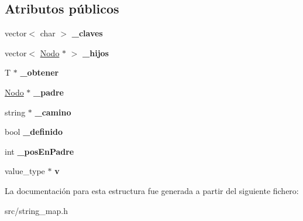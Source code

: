 \subsection*{Atributos públicos}
\begin{DoxyCompactItemize}
\item 
\hypertarget{structstring__map_1_1Nodo_a793784e5c0c9713764ef4023ad58f8d9}{vector$<$ char $>$ {\bfseries \-\_\-claves}}\label{structstring__map_1_1Nodo_a793784e5c0c9713764ef4023ad58f8d9}

\item 
\hypertarget{structstring__map_1_1Nodo_ae2d98d22f3bcb8dbb5ed114ba8603328}{vector$<$ \hyperlink{structstring__map_1_1Nodo}{Nodo} $\ast$ $>$ {\bfseries \-\_\-hijos}}\label{structstring__map_1_1Nodo_ae2d98d22f3bcb8dbb5ed114ba8603328}

\item 
\hypertarget{structstring__map_1_1Nodo_ab1ba84d07c625f2120ff58563edcaa0d}{T $\ast$ {\bfseries \-\_\-obtener}}\label{structstring__map_1_1Nodo_ab1ba84d07c625f2120ff58563edcaa0d}

\item 
\hypertarget{structstring__map_1_1Nodo_a62d242d0582019e18965463eaa1db910}{\hyperlink{structstring__map_1_1Nodo}{Nodo} $\ast$ {\bfseries \-\_\-padre}}\label{structstring__map_1_1Nodo_a62d242d0582019e18965463eaa1db910}

\item 
\hypertarget{structstring__map_1_1Nodo_a2f4d32924b849d2d366c25485ad1c072}{string $\ast$ {\bfseries \-\_\-camino}}\label{structstring__map_1_1Nodo_a2f4d32924b849d2d366c25485ad1c072}

\item 
\hypertarget{structstring__map_1_1Nodo_a0d081617ab62571ddceaffe4a8ea9f38}{bool {\bfseries \-\_\-definido}}\label{structstring__map_1_1Nodo_a0d081617ab62571ddceaffe4a8ea9f38}

\item 
\hypertarget{structstring__map_1_1Nodo_afc927f58dc591a437293d31ebdffa084}{int {\bfseries \-\_\-pos\-En\-Padre}}\label{structstring__map_1_1Nodo_afc927f58dc591a437293d31ebdffa084}

\item 
\hypertarget{structstring__map_1_1Nodo_a9fcf013757b89c9d9670195a4f76bc95}{value\-\_\-type $\ast$ {\bfseries v}}\label{structstring__map_1_1Nodo_a9fcf013757b89c9d9670195a4f76bc95}

\end{DoxyCompactItemize}


La documentación para esta estructura fue generada a partir del siguiente fichero\-:\begin{DoxyCompactItemize}
\item 
src/string\-\_\-map.\-h\end{DoxyCompactItemize}
